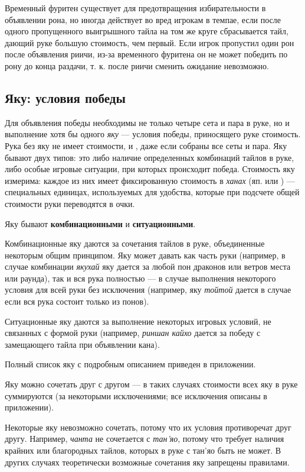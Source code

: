 Временный фуритен существует для предотвращения избирательности в объявлении рона, но иногда действует во вред игрокам в темпае, если после одного пропущенного выигрышного тайла на том же круге сбрасывается тайл, дающий руке большую стоимость, чем первый. Если игрок пропустил один рон после объявления риичи, из-за временного фуритена он не может победить по рону до конца раздачи, т. к. после риичи сменить ожидание невозможно.

\subsection{Яку: условия победы}

Для объявления победы необходимы не только четыре сета и пара в руке, но и выполнение хотя бы одного \textit{яку} --- условия победы, приносящего руке стоимость. Рука без яку не имеет стоимости, и , даже если собраны все сеты и пара. Яку бывают двух типов: это либо наличие определенных комбинаций тайлов в руке, либо особые игровые ситуации, при которых происходит победа. Стоимость яку измерима: каждое из них имеет фиксированную стоимость в \textit{ханах} (яп.  или ) --- специальных единицах, используемых для удобства, которые при подсчете общей стоимости руки переводятся в очки.

Яку бывают \textbf{комбинационными} и \textbf{ситуационными}. 

Комбинационные яку даются за сочетания тайлов в руке, объединенные некоторым общим принципом. Яку может давать как часть руки (например, в случае комбинации \textit{якухай} яку дается за любой пон драконов или ветров места или раунда), так и вся рука полностью --- в случае выполнения некоторого условия для всей руки без исключения (например, яку \textit{тойтой} дается в случае если вся рука состоит только из понов). 

Ситуационные яку даются за выполнение некоторых игровых условий, не связанных с формой руки (например, \textit{риншан кайхо} дается за победу с замещающего тайла при объявлении кана).

Полный список яку с подробным описанием приведен в приложении.

Яку можно сочетать друг с другом --- в таких случаях стоимости всех яку в руке суммируются (за некоторыми исключениями; все исключения описаны в приложении).

Некоторые яку невозможно сочетать, потому что их условия противоречат друг другу. Например, \textit{чанта} не сочетается с \textit{тан'яо}, потому что требует наличия крайних или благородных тайлов, которых в руке с тан'яо быть не может. В других случаях теоретически возможные сочетания яку запрещены правилами.

